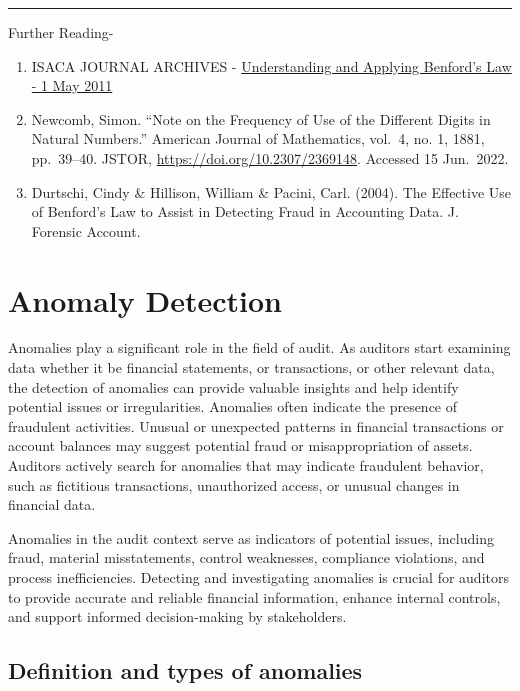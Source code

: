 \documentclass[
]{book}
\begin{document}
\begin{center}\rule{0.5\linewidth}{0.5pt}\end{center}

Further Reading-

\begin{enumerate}
\def\labelenumi{\arabic{enumi}.}
\item
  ISACA JOURNAL ARCHIVES - \href{https://www.isaca.org/resources/isaca-journal/past-issues/2011/understanding-and-applying-benfords-law}{Understanding and Applying Benford's Law - 1 May 2011}
\item
  Newcomb, Simon. ``Note on the Frequency of Use of the Different Digits in Natural Numbers.'' American Journal of Mathematics, vol.~4, no. 1, 1881, pp.~39--40. JSTOR, \url{https://doi.org/10.2307/2369148}. Accessed 15 Jun.~2022.
\item
  Durtschi, Cindy \& Hillison, William \& Pacini, Carl. (2004). The Effective Use of Benford's Law to Assist in Detecting Fraud in Accounting Data. J. Forensic Account.
\end{enumerate}

\hypertarget{anomaly-detection}{%
\chapter{Anomaly Detection}\label{anomaly-detection}}

Anomalies play a significant role in the field of audit. As auditors start examining data whether it be financial statements, or transactions, or other relevant data, the detection of anomalies can provide valuable insights and help identify potential issues or irregularities. Anomalies often indicate the presence of fraudulent activities. Unusual or unexpected patterns in financial transactions or account balances may suggest potential fraud or misappropriation of assets. Auditors actively search for anomalies that may indicate fraudulent behavior, such as fictitious transactions, unauthorized access, or unusual changes in financial data.

Anomalies in the audit context serve as indicators of potential issues, including fraud, material misstatements, control weaknesses, compliance violations, and process inefficiencies. Detecting and investigating anomalies is crucial for auditors to provide accurate and reliable financial information, enhance internal controls, and support informed decision-making by stakeholders.

\hypertarget{definition-and-types-of-anomalies}{%
\section{Definition and types of anomalies}\label{definition-and-types-of-anomalies}}
\end{document}
